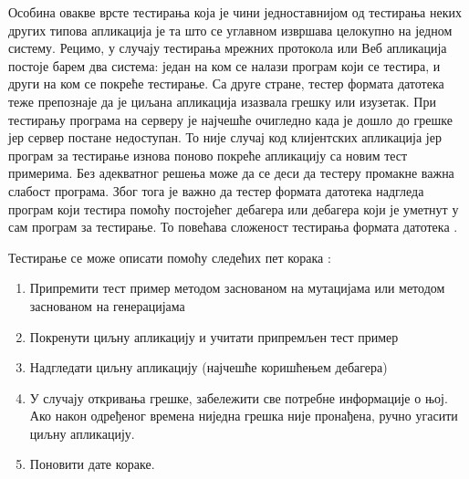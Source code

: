 \documentclass[12pt,oneside]{memoir}
\begin{document}
Особина овакве врсте тестирања која је чини једноставнијом од тестирања неких других типова апликација је та што се углавном извршава целокупно на једном систему. Рецимо, у случају  тестирања мрежних протокола или Веб апликација постоје барем два система: један на ком се налази програм који се тестира, и други на ком се покреће тестирање. Са друге стране, тестер формата датотека теже препознаје да је циљана апликација изазвала грешку или изузетак. При тестирању програма на серверу је најчешће очигледно када је дошло до грешке јер сервер постане недоступан. То није случај код клијентских апликација јер програм за тестирање изнова поново покреће апликацију са новим тест примерима. Без адекватног решења може да се деси да тестеру промакне важна слабост програма. Због тога је важно да тестер формата датотека надгледа програм који тестира помоћу постојећег дебагера или дебагера који је уметнут у сам програм за тестирање. То повећава сложеност тестирања формата датотека \cite{fuzzingBrute, fuzzing}.

Тестирање се може описати помоћу следећих пет корака \cite{fuzzingBrute}:
\begin{enumerate}
\item Припремити тест пример методом заснованом на мутацијама или методом заснованом на генерацијама
\item Покренути циљну апликацију и учитати припремљен тест пример
\item Надгледати циљну апликацију (најчешће коришћењем дебагера)
\item У случају откривања грешке, забележити све потребне информације о њој. Ако након одређеног времена ниједна грешка није пронађена, ручно угасити циљну апликацију. 
\item Поновити дате кораке.
\end{enumerate}
\end{document}
